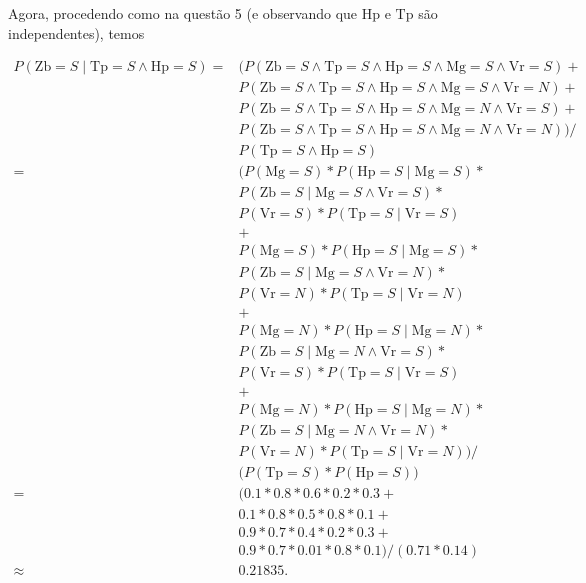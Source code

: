 \documentclass{article}
\newcommand{\Mg}{\mathrm{Mg}}
\newcommand{\Vr}{\mathrm{Vr}}
\newcommand{\Hp}{\mathrm{Hp}}
\newcommand{\Zb}{\mathrm{Zb}}
\newcommand{\Tp}{\mathrm{Tp}}
\begin{document}
Agora, procedendo como na questão 5
(e observando que $\Hp$ e $\Tp$ são independentes),
temos

\begin{align*}
    P(\Zb = S \mid \Tp = S \wedge \Hp = S) =& \Big(
        P(\Zb = S \wedge \Tp = S \wedge \Hp = S \wedge \Mg = S \wedge \Vr = S) + {} \\
      & P(\Zb = S \wedge \Tp = S \wedge \Hp = S \wedge \Mg = S \wedge \Vr = N) + {} \\
      & P(\Zb = S \wedge \Tp = S \wedge \Hp = S \wedge \Mg = N \wedge \Vr = S) + {} \\
      & P(\Zb = S \wedge \Tp = S \wedge \Hp = S \wedge \Mg = N \wedge \Vr = N)
        \Big) /\\
      & P( \Tp = S \wedge \Hp = S )
    \\
      = & \Big(
          P(\Mg = S) * P(\Hp = S \mid \Mg = S) * {}\\
        & P(\Zb = S \mid \Mg = S \wedge \Vr = S) * {}\\
        & P(\Vr = S) * P(\Tp = S \mid \Vr = S) \\
        & + \\
        & P(\Mg = S) * P(\Hp = S \mid \Mg = S) * {}\\
        & P(\Zb = S \mid \Mg = S \wedge \Vr = N) * {}\\
        & P(\Vr = N) * P(\Tp = S \mid \Vr = N) \\
        & + \\
        & P(\Mg = N) * P(\Hp = S \mid \Mg = N) * {}\\
        & P(\Zb = S \mid \Mg = N \wedge \Vr = S) * {}\\
        & P(\Vr = S) * P(\Tp = S \mid \Vr = S) \\
        & + \\
        & P(\Mg = N) * P(\Hp = S \mid \Mg = N) * {}\\
        & P(\Zb = S \mid \Mg = N \wedge \Vr = N) * {}\\
        & P(\Vr = N) * P(\Tp = S \mid \Vr = N)
        \Big) /\\
        & \big( P( \Tp = S ) * P( \Hp = S ) \big) \\
      = & (0.1*0.8*0.6 *0.2*0.3+{}\\
        & 0.1*0.8*0.5 *0.8*0.1+{}\\
        & 0.9*0.7*0.4 *0.2*0.3+{}\\
        & 0.9*0.7*0.01*0.8*0.1) / (0.71 * 0.14)\\
      \approx& 0.21835.
\end{align*}
\end{document}
